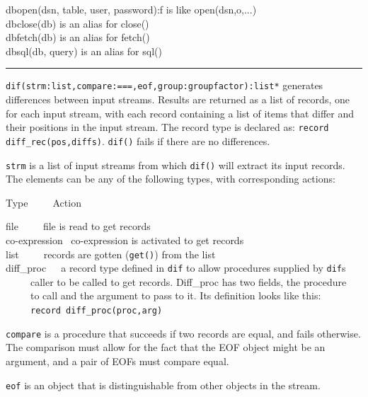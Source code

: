 dbopen(dsn, table, user, password):f is like
open(dsn,{\textquotedbl}o{\textquotedbl},...)\\
dbclose(db) is an alias for close()\\
dbfetch(db) is an alias for fetch()\\
dbsql(db, query) is an alias for sql()

\vspace{0.25cm}\hrule{}

\texttt{dif(strm:list,compare:{\textquotedbl}==={\textquotedbl},eof,group:groupfactor):list*}
generates differences between input streams. Results are
returned as a list of records, one for each input stream, with each
record containing a list of items that differ and their positions in
the input stream. The record type is declared as: \texttt{record
diff\_rec(pos,diffs)}. \texttt{dif()} fails if there are no
differences.

\texttt{strm} is a list of input streams from which \texttt{dif()} will
extract its input {\textquotedbl}records{\textquotedbl}. The elements
can be any of the following types, with corresponding actions:

Type\ \ \ \  \ Action

file\ \ \ \  \ file is {\textquotedbl}read{\textquotedbl} to get
records\\
co-expression \ co-expression is activated to get records\\
list\ \ \ \  \ records are {\textquotedbl}gotten{\textquotedbl}
(\texttt{get()}) from the list\\
diff\_proc\ \  \ a record type defined in \texttt{dif} to allow
procedures supplied by \texttt{dif}{\textquotesingle}s\\
 \ \ \ \  \ caller to be called to get records. Diff\_proc has two
fields, the procedure\\
 \ \ \ \  \ to call and the argument to pass to it. Its definition looks
like this:\\
 \ \ \ \  \ \texttt{record diff\_proc(proc,arg)}

\texttt{compare} is a procedure that succeeds if two records are
{\textquotedbl}equal{\textquotedbl}, and fails otherwise. The
comparison must allow for the fact that the EOF object might be an
argument, and a pair of EOFs must compare equal.

\texttt{eof} is an object that is distinguishable from other objects in
the stream.

